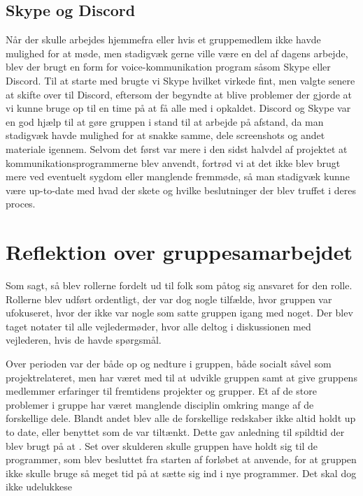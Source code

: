 \subsection{Skype og Discord}\label{SkypeOgDiscord}
Når der skulle arbejdes hjemmefra eller hvis et gruppemedlem ikke havde mulighed for at møde, men stadigvæk gerne ville være en del af dagens arbejde, blev der brugt en form for voice-kommunikation program såsom Skype eller Discord. Til at starte med brugte vi Skype hvilket virkede fint, men valgte senere at skifte over til Discord, eftersom der begyndte at blive problemer der gjorde at vi kunne bruge op til en time på at få alle med i opkaldet. Discord og Skype var en god hjælp til at gøre gruppen i stand til at arbejde på afstand, da man stadigvæk havde mulighed for at snakke samme, dele screenshots og andet materiale igennem. Selvom det først var mere i den sidst halvdel af projektet at kommunikationsprogrammerne blev anvendt, fortrød vi at det ikke blev brugt mere ved eventuelt sygdom eller manglende fremmøde, så man stadigvæk kunne være up-to-date med hvad der skete og hvilke beslutninger der blev truffet i deres proces. 

\section{Reflektion over gruppesamarbejdet}\label{Reflektion-over-gruppesamarbejdet}
Som sagt, så blev rollerne fordelt ud til folk som påtog sig ansvaret for den rolle. Rollerne blev udført ordentligt, der var dog nogle tilfælde, hvor gruppen var ufokuseret, hvor der ikke var nogle som satte gruppen igang med noget. Der blev taget notater til alle vejledermøder, hvor alle deltog i diskussionen med vejlederen, hvis de havde spørgsmål.

Over perioden var der både op og nedture i gruppen, både socialt såvel som projektrelateret, men har været med til at udvikle gruppen samt at give gruppens medlemmer erfaringer til fremtidens projekter og grupper. Et af de store problemer i gruppe har været manglende disciplin omkring mange af de forskellige dele. Blandt andet blev alle de forskellige redskaber ikke altid holdt up to date, eller benyttet som de var tiltænkt. Dette gav anledning til spildtid der blev brugt på at . Set over skulderen skulle gruppen have holdt sig til de programmer, som blev besluttet fra starten af forløbet at anvende, for at gruppen ikke skulle bruge så meget tid på at sætte sig ind i nye programmer. Det skal dog ikke udelukkese